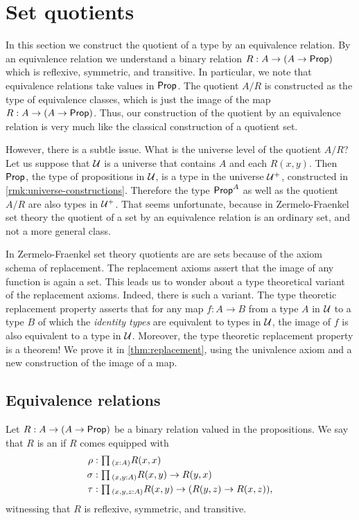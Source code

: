 \section{Set quotients}

In this section we construct the quotient of a type by an equivalence relation. By an equivalence relation we understand a binary relation $R:A\to(A\to\mathsf{Prop})$ which is reflexive, symmetric, and transitive. In particular, we note that equivalence relations take values in $\mathsf{Prop}$. The quotient $A/R$ is constructed as the type of equivalence classes, which is just the image of the map $R:A\to (A\to\mathsf{Prop})$. Thus, our construction of the quotient by an equivalence relation is very much like the classical construction of a quotient set.

However, there is a subtle issue. What is the universe level of the quotient $A/R$? Let us suppose that $\mathcal{U}$ is a universe that contains $A$ and each $R(x,y)$. Then $\mathsf{Prop}$, the type of propositions in $\mathcal{U}$, is a type in the universe $\mathcal{U}^+$, constructed in \cref{rmk:universe-constructions}. Therefore the type $\mathsf{Prop}^A$ as well as the quotient $A/R$ are also types in $\mathcal{U}^+$. That seems unfortunate, because in Zermelo-Fraenkel set theory the quotient of a set by an equivalence relation is an ordinary set, and not a more general class.

In Zermelo-Fraenkel set theory quotients are are sets because of the axiom schema of replacement. The replacement axioms assert that the image of any function is again a set. This leads us to wonder about a type theoretical variant of the replacement axioms. Indeed, there is such a variant. The type theoretic replacement property asserts that for any map $f:A\to B$ from a type $A$ in $\mathcal{U}$ to a type $B$ of which the \emph{identity types} are equivalent to types in $\mathcal{U}$, the image of $f$ is also equivalent to a type in $\mathcal{U}$. Moreover, the type theoretic replacement property is a theorem! We prove it in \cref{thm:replacement}, using the univalence axiom and a new construction of the image of a map.

\subsection{Equivalence relations}

\begin{defn}\label{defn:eq_rel}
Let $R:A\to (A\to\mathsf{Prop})$ be a binary relation valued in the propositions. We say that $R$ is an  if $R$ comes equipped with
\begin{align*}
\rho & : \prd{x:A}R(x,x) \\
\sigma & : \prd{x,y:A} R(x,y)\to R(y,x) \\
\tau & : \prd{x,y,z:A} R(x,y)\to (R(y,z)\to R(x,z)),
\end{align*}
witnessing that $R$ is reflexive, symmetric, and transitive.
\end{defn}

